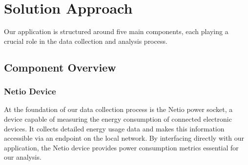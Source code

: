 \label{sec:approach}

\section{Solution Approach}
\begin{comment}
Given task
- build a video player able to change playback settings (bitrate, ...) 
- collect CMCD data during playback of videos
- collect energy consumption data from playback device via Netio smart power plugs
- combine and analyse data in Grafana dashboards

first approach
- get familiar with the technology \& develop architecture (workshop 1)
- 

changes during development process
- simplified architecture 


- Grafana dashboard (Max)
    different diagramms: .... TODO
- everythin in docker (Max)
    
\end{comment}
\begin{comment}
problems we had:
- requesting netio data: concurrency -> from setTimeout to node-scheduling ( aspect: get the resting power consumption of the device when no video is played to be able to normalize the data)
- store the video data -> TUBCloud to example video files on dash website (no storing in the git repo, no downloading for the user, easy access)
- creating the session id in the frontend -> not best practice (theoretically, the id can be assigned twice)
- exposing the netio device to the internet
- baseline energy consumption of devices
\end{comment}

Our application is structured around five main components, each playing a crucial role in the data collection and analysis process.

\subsection{Component Overview}

\subsubsection{Netio Device} At the foundation of our data collection process is the Netio power socket, a device capable of measuring the energy consumption of connected electronic devices. 
It collects detailed energy usage data and makes this information accessible via an endpoint on the local network. 
By interfacing directly with our application, the Netio device provides power consumption metrics essential for our analysis.

